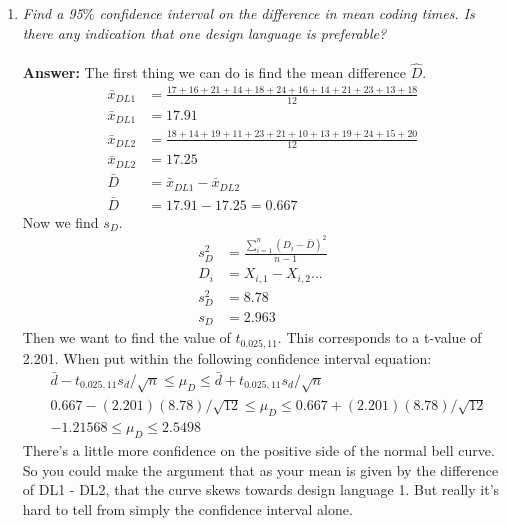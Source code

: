 \documentclass[11pt]{article}
\begin{document}
\begin{enumerate}
\item \emph{Find a 95$\%$ confidence interval on the difference in mean coding times. Is there any indication that one design language is preferable?}\\
\\\textbf{Answer:} 
The first thing we can do is find the mean difference $\hat{D}$.
\begin{equation}
\begin{split}
\bar{x}_{DL1} &= \frac{17+16+21+14+18+24+16+14+21+23+13+18}{12} \\
\bar{x}_{DL1} &= 17.91 \\
\bar{x}_{DL2} &= \frac{18+14+19+11+23+21+10+13+19+24+15+20}{12} \\
\bar{x}_{DL2} &= 17.25 \\
\bar{D} &= \bar{x}_{DL1} - \bar{x}_{DL2}\\
\bar{D} &=17.91 - 17.25 = 0.667
\end{split}
\end{equation}
Now we find $s_D$.
\begin{equation}
\begin{split}
s_D^2 &= \frac{\sum_{i=1}^{n}(D_i-\bar{D})^2}{n-1}\\
D_i&=X_{i,1} - X_{i,2}...\\
s_D^2 &= 8.78\\
s_D &=2.963
\end{split}
\end{equation}
Then we want to find the value of $t_{0.025, 11}$. This corresponds to a t-value of 2.201. When put within the following confidence interval equation:
\begin{equation}
\begin{split}
&\bar{d}  - t_{0.025, 11}s_d/\sqrt{n} \leq \mu_D \leq \bar{d}  + t_{0.025, 11}s_d/\sqrt{n} \\
&0.667 - (2.201)(8.78)/\sqrt{12}  \leq \mu_D \leq 0.667 + (2.201)(8.78)/\sqrt{12}\\
&-1.21568\leq \mu_D \leq 2.5498
\end{split}
\end{equation}
There's a little more confidence on the positive side of the normal bell curve. So you could make the argument that as your mean is given by the difference of DL1 - DL2, that the curve skews towards design language 1. But really it's hard to tell from simply the confidence interval alone.
\end{enumerate}
\end{document}

